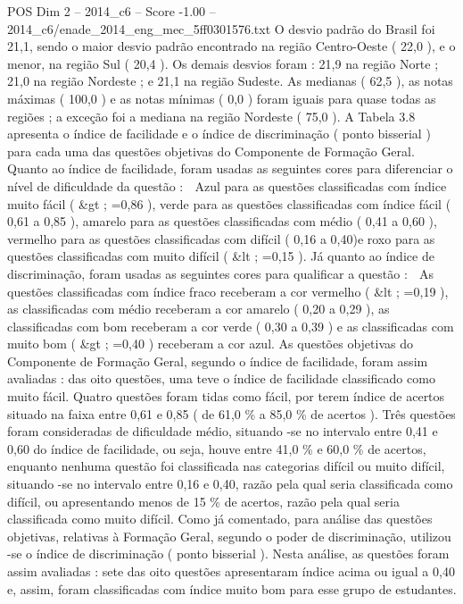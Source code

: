 \begin{textsample}{POS Dim 2 – 2014\_c6 – Score -1.00 – 2014\_c6/enade\_2014\_eng\_mec\_5ff0301576.txt}
O desvio padrão do Brasil foi 21,1, sendo o maior desvio padrão encontrado na região Centro-Oeste ( 22,0 ), e o menor, na região Sul ( 20,4 ).
Os demais desvios foram : 21,9 na região Norte ; 21,0 na região Nordeste ; e 21,1 na região Sudeste.
As medianas ( 62,5 ), as notas máximas ( 100,0 ) e as notas mínimas ( 0,0 ) foram iguais para quase todas as regiões ; a exceção foi a mediana na região Nordeste ( 75,0 ).
A Tabela 3.8 apresenta o índice de facilidade e o índice de discriminação ( ponto bisserial ) para cada uma das questões objetivas do Componente de Formação Geral.
Quanto ao índice de facilidade, foram usadas as seguintes cores para diferenciar o nível de dificuldade da questão :  Azul para as questões classificadas com índice muito fácil ( \&gt ; =0,86 ), verde para as questões classificadas com índice fácil ( 0,61 a 0,85 ), amarelo para as questões classificadas com médio ( 0,41 a 0,60 ), vermelho para as questões classificadas com difícil ( 0,16 a 0,40)e roxo para as questões classificadas com muito difícil ( \&lt ; =0,15 ).
Já quanto ao índice de discriminação, foram usadas as seguintes cores para qualificar a questão :  As questões classificadas com índice fraco receberam a cor vermelho ( \&lt ; =0,19 ), as classificadas com médio receberam a cor amarelo ( 0,20 a 0,29 ), as classificadas com bom receberam a cor verde ( 0,30 a 0,39 ) e as classificadas com muito bom ( \&gt ; =0,40 ) receberam a cor azul.
As questões objetivas do Componente de Formação Geral, segundo o índice de facilidade, foram assim avaliadas : das oito questões, uma teve o índice de facilidade classificado como muito fácil.
Quatro questões foram tidas como fácil, por terem índice de acertos situado na faixa entre 0,61 e 0,85 ( de 61,0 \% a 85,0 \% de acertos ).
Três questões foram consideradas de dificuldade médio, situando -se no intervalo entre 0,41 e 0,60 do índice de facilidade, ou seja, houve entre 41,0 \% e 60,0 \% de acertos, enquanto nenhuma questão foi classificada nas categorias difícil ou muito difícil, situando -se no intervalo entre 0,16 e 0,40, razão pela qual seria classificada como difícil, ou apresentando menos de 15 \% de acertos, razão pela qual seria classificada como muito difícil.
Como já comentado, para análise das questões objetivas, relativas à Formação Geral, segundo o poder de discriminação, utilizou -se o índice de discriminação ( ponto bisserial ).
Nesta análise, as questões foram assim avaliadas : sete das oito questões apresentaram índice acima ou igual a 0,40 e, assim, foram classificadas com índice muito bom para esse grupo de estudantes.

\end{textsample}
